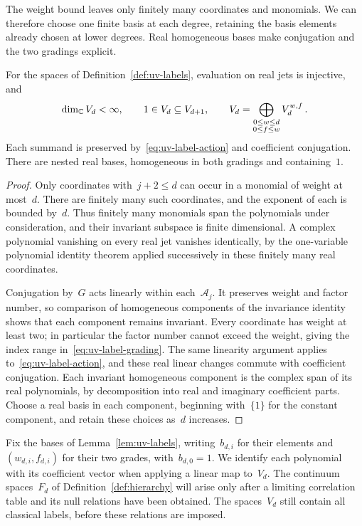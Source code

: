 The weight bound leaves only finitely many coordinates and monomials.
We can therefore choose one finite basis at each degree, retaining the basis elements already chosen at lower degrees.
Real homogeneous bases make conjugation and the two gradings explicit.

\begin{lemma}\label{lem:uv-labels}
For the spaces of Definition~\ref{def:uv-labels}, evaluation on real jets is injective, and
\begin{equation}\label{eq:uv-label-grading}
 \dim_\mathbb C V_d<\infty,\qquad 1\in V_d\subseteq V_{d+1},\qquad
 V_d=\bigoplus_{\substack{0\le w\le d\\0\le f\le w}}V_d^{w,f}\,.
\end{equation}
Each summand is preserved by~\eqref{eq:uv-label-action} and coefficient conjugation.
There are nested real bases, homogeneous in both gradings and containing~$1$.
\end{lemma}

\begin{proof}
Only coordinates with~$j+2\le d$ can occur in a monomial of weight at most~$d$.
There are finitely many such coordinates, and the exponent of each is bounded by~$d$.
Thus finitely many monomials span the polynomials under consideration, and their invariant subspace is finite dimensional.
A complex polynomial vanishing on every real jet vanishes identically, by the one-variable polynomial identity theorem applied successively in these finitely many real coordinates.

Conjugation by~$G$ acts linearly within each~$\mathcal A_j$.
It preserves weight and factor number, so comparison of homogeneous components of the invariance identity shows that each component remains invariant.
Every coordinate has weight at least two; in particular the factor number cannot exceed the weight, giving the index range in~\eqref{eq:uv-label-grading}.
The same linearity argument applies to~\eqref{eq:uv-label-action}, and these real linear changes commute with coefficient conjugation.
Each invariant homogeneous component is the complex span of its real polynomials, by decomposition into real and imaginary coefficient parts.
Choose a real basis in each component, beginning with~$\{1\}$ for the constant component, and retain these choices as~$d$ increases.
\end{proof}

Fix the bases of Lemma~\ref{lem:uv-labels}, writing~$b_{d,i}$ for their elements and~$(w_{d,i},f_{d,i})$ for their two grades, with~$b_{d,0}=1$.
We identify each polynomial with its coefficient vector when applying a linear map to~$V_d$.
The continuum spaces~$F_d$ of Definition~\ref{def:hierarchy} will arise only after a limiting correlation table and its null relations have been obtained.
The spaces~$V_d$ still contain all classical labels, before these relations are imposed.

